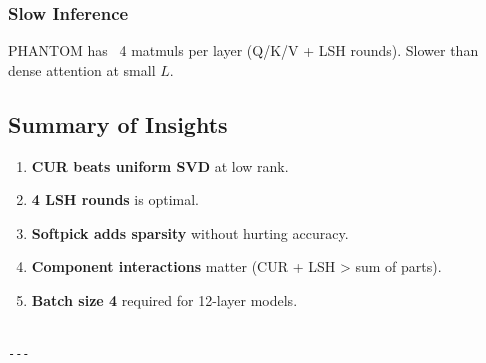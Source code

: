 \subsubsection{Slow Inference}

PHANTOM has ~4 matmuls per layer (Q/K/V + LSH rounds). Slower than dense 
attention at small $L$.

\subsection{Summary of Insights}

\begin{enumerate}
\item \textbf{CUR beats uniform SVD} at low rank.
\item \textbf{4 LSH rounds} is optimal.
\item \textbf{Softpick adds sparsity} without hurting accuracy.
\item \textbf{Component interactions} matter (CUR + LSH \textgreater{} sum of parts).
\item \textbf{Batch size 4} required for 12-layer models.
\end{enumerate}
\begin{lstlisting}

---
\end{lstlisting}